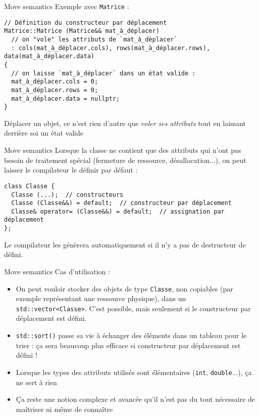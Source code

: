 \documentclass[c]{beamer}
\newcommand{\inline}[1]{\texttt{#1}}
\begin{document}

\begin{frame}[fragile]{Move semantics}
Exemple avec \inline{Matrice} :
\vspace{1em}
\begin{verbatim}
// Définition du constructeur par déplacement
Matrice::Matrice (Matrice&& mat_à_déplacer)
  // on "vole" les attributs de `mat_à_déplacer`
  : cols(mat_à_déplacer.cols), rows(mat_à_déplacer.rows), data(mat_à_déplacer.data)
{
  // on laisse `mat_à_déplacer` dans un état valide :
  mat_à_déplacer.cols = 0;
  mat_à_déplacer.rows = 0;
  mat_à_déplacer.data = nullptr;
}
\end{verbatim}
\vspace{1em}
Déplacer un objet, ce n'est rien d'autre que \emph{voler ses attributs} tout en laissant derrière soi un état valide
\end{frame}

\begin{frame}[fragile]{Move semantics}
Lorsque la classe ne contient que des attributs qui n'ont pas besoin de traitement spécial (fermeture de ressource, désallocation...), on peut laisser le compilateur le définir par défaut :
\begin{verbatim}
class Classe {
  Classe (...);  // constructeurs
  Classe (Classe&&) = default;  // constructeur par déplacement
  Classe& operator= (Classe&&) = default;  // assignation par déplacement
};
\end{verbatim}
Le compilateur les génèrera automatiquement si il n'y a pas de destructeur de défini.
\end{frame}


\begin{frame}[fragile]{Move semantics}
Cas d'utilisation :
\begin{itemize}
  \item On peut vouloir stocker des objets de type \inline{Classe}, non copiables (par exemple représentant une ressource physique), dans un \inline{std::vector<Classe>}. C'est possible, mais seulement si le constructeur par déplacement est défini.
  \item \inline{std::sort()} passe sa vie à échanger des éléments dans un tableau pour le trier : ça sera beaucoup plus efficace si constructeur par déplacement est défini !
  \item Lorsque les types des attributs utilisés sont élémentaires (\inline{int}, \inline{double}...), ça ne sert à rien
  \item Ça reste une notion complexe et avancée qu'il n'est pas du tout nécessaire de maîtriser ni même de connaître
\end{itemize}
\end{frame}
\end{document}
